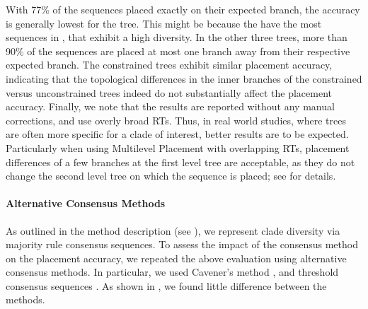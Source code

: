 With 77\% of the sequences placed exactly on their expected branch,
the accuracy is generally lowest for the  tree.
This might be because the  have the most sequences in , that exhibit a high diversity.
In the other three trees, more than 90\% of the sequences are placed
at most one branch away from their respective expected branch.
The constrained trees exhibit similar placement accuracy,
indicating that the topological differences in the inner branches of the constrained versus unconstrained trees
indeed do not substantially affect the placement accuracy.
Finally, we note that the results are reported without any manual corrections, and use overly broad \acp{RT}.
Thus, in real world studies, where trees are often more specific for a clade of interest,
better results are to be expected.
Particularly when using Multilevel Placement with overlapping \acp{RT},
placement differences of a few branches at the first level tree are acceptable,
as they do not change the second level tree on which the sequence is placed;
see  for details.

\paragraph{Alternative Consensus Methods}
\label{ch:AutomaticTrees:sec:Evaluation:sub:Accuracy:par:ConsensusMethods}

As outlined in the method description (see ),
we represent clade diversity via majority rule consensus sequences.
To assess the impact of the consensus method on the placement accuracy,
we repeated the above evaluation using alternative consensus methods.
In particular, we used Cavener's method \citep{Cavener1987,Cavener1991a},
and threshold consensus sequences \citep{Day1992a,Day1992}.
As shown in , we found little difference between the methods.

